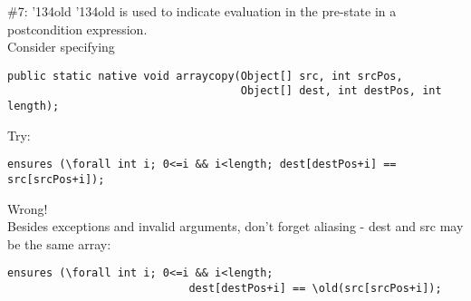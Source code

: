 \documentclass[
pdf,
nocolorBG,
slideColor,
cok,
]{prosper}
\newcommand{\bsl}{\char'134}
\newcommand{\old}{\bsl old}
\begin{document}

\begin{slide}{\#7: \old}
\vspace*{-6ex}
{\knalblue \old} is used to indicate evaluation in the pre-state in a postcondition expression.\\
\vspace{1ex}
Consider specifying
{\tiny
\begin{verbatim} 
public static native void arraycopy(Object[] src, int srcPos,
                                    Object[] dest, int destPos, int length);
\end{verbatim}
}
Try:
{\tiny
\begin{verbatim} 
ensures (\forall int i; 0<=i && i<length; dest[destPos+i] == src[srcPos+i]);
\end{verbatim}
}

{\red
Wrong!}\\
\vspace{1ex}
Besides exceptions and invalid arguments, don't forget aliasing - {\blue dest} and {\blue src} may be the same array:
{\tiny
\begin{verbatim} 
ensures (\forall int i; 0<=i && i<length; 
                            dest[destPos+i] == \old(src[srcPos+i]);
\end{verbatim}
}

\end{slide}

\end{document}
